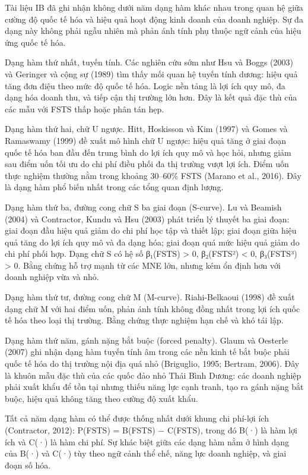 \documentclass[
  a4paper,
  13pt]{extreport}
\begin{document}
Tài liệu IB đã ghi nhận không dưới năm dạng hàm khác nhau trong quan hệ
giữa cường độ quốc tế hóa và hiệu quả hoạt động kinh doanh của doanh
nghiệp. Sự đa dạng này không phải ngẫu nhiên mà phản ánh tính phụ thuộc
ngữ cảnh của hiệu ứng quốc tế hóa.

Dạng hàm thứ nhất, tuyến tính. Các nghiên cứu sớm như Hsu và Boggs
(2003) và Geringer và cộng sự (1989) tìm thấy mối quan hệ tuyến tính
dương: hiệu quả tăng đơn điệu theo mức độ quốc tế hóa. Logic nền tảng là
lợi ích quy mô, đa dạng hóa doanh thu, và tiếp cận thị trường lớn hơn.
Đây là kết quả đặc thù của các mẫu với FSTS thấp hoặc phân tán hẹp.

Dạng hàm thứ hai, chữ U ngược. Hitt, Hoskisson và Kim (1997) và Gomes và
Ramaswamy (1999) đề xuất mô hình chữ U ngược: hiệu quả tăng ở giai đoạn
quốc tế hóa ban đầu đến trung bình do lợi ích quy mô và học hỏi, nhưng
giảm sau điểm uốn tối ưu do chi phí điều phối đa thị trường vượt lợi
ích. Điểm uốn thực nghiệm thường nằm trong khoảng 30--60\% FSTS (Marano
et al., 2016). Đây là dạng hàm phổ biến nhất trong các tổng quan định
lượng.

Dạng hàm thứ ba, đường cong chữ S ba giai đoạn (S-curve). Lu và Beamish
(2004) và Contractor, Kundu và Hsu (2003) phát triển lý thuyết ba giai
đoạn: giai đoạn đầu hiệu quả giảm do chi phí học tập và thiết lập; giai
đoạn giữa hiệu quả tăng do lợi ích quy mô và đa dạng hóa; giai đoạn quá
mức hiệu quả giảm do chi phí phối hợp. Dạng chữ S có hệ số β₁(FSTS)
\textgreater{} 0, β₂(FSTS²) \textless{} 0, β₃(FSTS³) \textgreater{} 0.
Bằng chứng hỗ trợ mạnh từ các MNE lớn, nhưng kém ổn định hơn với doanh
nghiệp vừa và nhỏ.

Dạng hàm thứ tư, đường cong chữ M (M-curve). Riahi-Belkaoui (1998) đề
xuất dạng chữ M với hai điểm uốn, phản ánh tính không đồng nhất trong
lợi ích quốc tế hóa theo loại thị trường. Bằng chứng thực nghiệm hạn chế
và khó tái lập.

Dạng hàm thứ năm, gánh nặng bắt buộc (forced penalty). Glaum và Oesterle
(2007) ghi nhận dạng hàm tuyến tính âm trong các nền kinh tế bắt buộc
phải quốc tế hóa do thị trường nội địa quá nhỏ (Briguglio, 1995;
Bertram, 2006). Đây là khuôn mẫu đặc thù của các quốc đảo nhỏ Thái Bình
Dương: các doanh nghiệp phải xuất khẩu để tồn tại nhưng thiếu năng lực
cạnh tranh, tạo ra gánh nặng bắt buộc, hiệu quả không tăng theo cường độ
xuất khẩu.

Tất cả năm dạng hàm có thể được thống nhất dưới khung chi phí-lợi ích
(Contractor, 2012): P(FSTS) = B(FSTS) − C(FSTS), trong đó B(·) là hàm
lợi ích và C(·) là hàm chi phí. Sự khác biệt giữa các dạng hàm nằm ở
hình dạng của B(·) và C(·) tùy theo ngữ cảnh thể chế, năng lực doanh
nghiệp, và giai đoạn số hóa.
\end{document}
